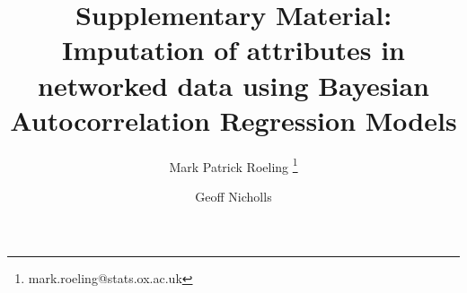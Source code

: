 \documentclass{article}
\begin{document}
\title{Supplementary Material: Imputation of attributes in networked data using Bayesian Autocorrelation Regression Models}
\author[1]{Mark Patrick Roeling \thanks{mark.roeling@stats.ox.ac.uk}}
\author[1]{Geoff Nicholls}
\maketitle
	
\doublespacing
\newpage
	

\end{document}
